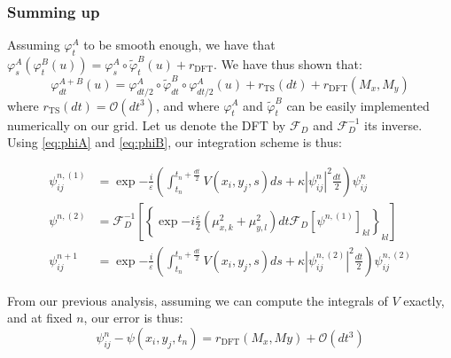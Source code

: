 \documentclass{article}
\begin{document}
\subsubsection*{Summing up}
Assuming $\varphi_t^A$ to be smooth enough, we have that $\varphi_s^A(\varphi_t^B(u))=\varphi_s^A\circ\tilde{\varphi}_t^B(u)+r_\text{DFT}$. We have thus shown that:
$$\varphi^{A+B}_{dt}(u)=\varphi^A_{dt/2}\circ\tilde{\varphi}^B_{dt}\circ\varphi^A_{dt/2}(u)+r_\text{TS}(dt)+r_\text{DFT}(M_x,M_y)$$
where $r_\text{TS}(dt)=\mathcal{O}(dt^3)$, and where $\varphi^A_t$ and $\tilde {\varphi}^B_t$ can be easily implemented numerically on our grid. Let us denote the DFT by $\mathcal{F}_D$ and $\mathcal{F}_D^{-1}$ its inverse. Using \eqref{eq:phiA} and \eqref{eq:phiB}, our integration scheme is thus:
\begin{framed}
$$
\begin{aligned}
\psi^{n,(1)}_{ij}&=\exp{-\frac{i}{\varepsilon}\left(\int_{t_n}^{t_n+\frac{dt}{2}} V(x_i,y_j,s)ds +\kappa|\psi^n_{ij}|^{2}\frac{dt}{2}\right)}\psi^n_{ij}\\
\psi^{n,(2)}&=\mathcal{F}_D^{-1}\left[\left\{\exp{-i\frac{\varepsilon}{2}\left(\mu_{x,k}^2+\mu_{y,l}^2\right)dt}\mathcal{F}_D\left[\psi^{n,(1)}\right]_{kl}\right\}_{kl}\right]\\
\psi^{n+1}_{ij}&=\exp{-\frac{i}{\varepsilon}\left(\int_{t_n}^{t_n+\frac{dt}{2}} V(x_i,y_j,s)ds +\kappa|\psi^{n,(2)}_{ij}|^{2}\frac{dt}{2}\right)}\psi^{n,(2)}_{ij}
\end{aligned}
$$
\end{framed}
From our previous analysis, assuming we can compute the integrals of $V$ exactly, and at fixed $n$, our error is thus:
$$
\psi^n_{ij} -\psi(x_i,y_j,t_n)=r_\text{DFT}(M_x,My)+\mathcal{O}(dt^3)
$$
\end{document}
